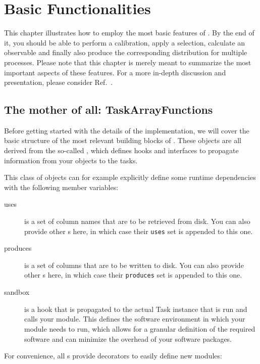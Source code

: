 \chapter{Basic Functionalities}\label{chap:basics}

This chapter illustrates how to employ the most basic features of \columnflow.
By the end of it, you should be able to perform a calibration, apply a selection, calculate an observable and finally also produce the corresponding distribution for multiple processes.
Please note that this chapter is merely meant to summarize the most important aspects of these features.
For a more in-depth discussion and presentation, please consider Ref.~\cite{cf_repo}.

\section{The mother of all: TaskArrayFunctions}\label{sec:taskarrayfunc}

Before getting started with the details of the implementation, we will cover the basic structure of the most relevant building blocks of \columnflow.
These objects are all derived from the so-called , which defines hooks and interfaces to propagate information from your objects to the \columnflow tasks.

This class of objects can for example explicitly define some runtime dependencies with the following member variables:
\begin{description}
	\item[uses] is a set of column names that are to be retrieved from disk.
	You can also provide other s here, in which case their \texttt{uses} set is appended to this one.
	\item[produces] is a set of columns that are to be written to disk.
	You can also provide other s here, in which case their \texttt{produces} set is appended to this one.
	\item[sandbox] is a hook that is propagated to the actual Task instance that is run and calls your module.
	This defines the software environment in which your module needs to run, which allows for a granular definition of the required software and can minimize the overhead of your software packages.
	
\end{description}

For convenience, all  s provide decorators to easily define new modules:

